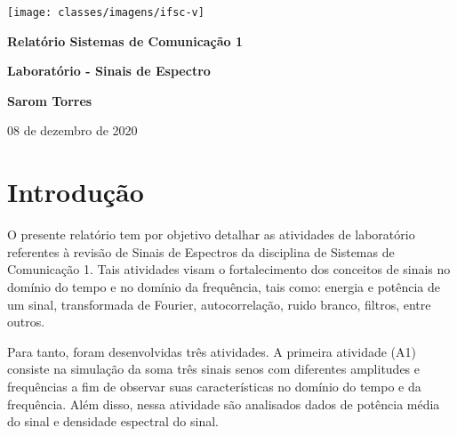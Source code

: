 \documentclass[11pt]{classes/ifscarticle}
\begin{document}
\begin{center}

\texttt{[image: classes/imagens/ifsc-v]}
\vspace{7.5cm}

{\huge \bfseries Relatório Sistemas de Comunicação 1}

\vspace{.5cm}

{\large \bfseries  Laboratório - Sinais de Espectro}

\vfill
\end{center}

{\noindent \large \bfseries 
Sarom Torres%
}

\begin{flushright}
08 de dezembro de 2020
\end{flushright}

\clearpage
\pagestyle{firstpage}

\tableofcontents
\clearpage


\section{Introdução}
\label{cap:introducao}

O presente relatório tem por objetivo detalhar as atividades de laboratório referentes à revisão de Sinais de Espectros da disciplina de Sistemas de Comunicação 1. Tais atividades visam o fortalecimento dos conceitos de sinais no domínio do tempo e no domínio da frequência, tais como: energia e potência de um sinal, transformada de Fourier, autocorrelação, ruido branco, filtros, entre outros.

Para tanto, foram desenvolvidas três atividades. A primeira atividade (A1) consiste na simulação da soma três sinais senos com diferentes amplitudes e frequências a fim de observar suas características no domínio do tempo e da frequência. Além disso, nessa atividade são analisados dados de potência média do sinal e densidade espectral do sinal.
\end{document}
